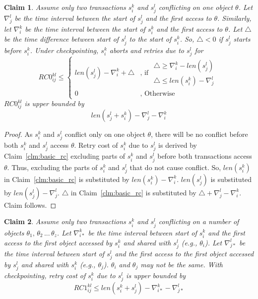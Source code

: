\documentclass[conference]{IEEEtran}
\newtheorem{clm}{Claim}
\begin{document}
\begin{clm}\label{clm:2_tx_cp_retry_cost}
Assume only two transactions $s_i^k$ and $s_j^l$ conflicting on one object $\theta$. Let $\nabla_{j}^{l}$ be the time interval between the start of $s_{j}^{l}$ and the first access to $\theta$. Similarly, let $\nabla_{i}^{k}$ be the time interval between the start of $s_i^k$ and the first access to $\theta$. Let $\triangle$ be the time difference between start of $s_j^l$ to the start of $s_i^k$. So, $\triangle < 0$ if $s_j^l$ starts before $s_i^k$. Under checkpointing, $s_{i}^{k}$ aborts and retries due to $s_{j}^{l}$
for 
\begin{equation}
RC0_{ij}^{kl} \le \begin{cases}
len\left(s_{j}^{l}\right)-\nabla_{i}^{k}+\triangle & \mbox{, if }\begin{gathered}\triangle\ge\nabla_{i}^{k}-len\left(s_{j}^{l}\right)\\
\triangle\le len\left(s_{i}^{k}\right)-\nabla_{j}^{l}
\end{gathered}
\\
0 & \mbox{, Otherwise}
\end{cases}\label{eq:2_tx_cp_retry_cost}
\end{equation}
%
$RC0_{ij}^{kl}$ is upper bounded by 
\begin{equation}
len\left(s_{j}^{l}+s_{i}^{k}\right)-\nabla_{j}^{l}-\nabla_{i}^{k}\label{eq:rc0_upper_bound}
\end{equation}

\end{clm}
%
\begin{proof}
%
As $s_i^k$ and $s_j^l$ conflict only on one object $\theta$, there will be no conflict before both $s_i^k$ and $s_j^l$ access $\theta$. Retry cost of $s_i^k$ due to $s_j^l$ is derived by Claim~\ref{clm:basic_rc} excluding parts of $s_i^k$ and $s_j^l$ before both transactions access $\theta$. Thus, excluding the parts of $s_i^k$ and $s_j^l$ that do not cause conflict. So, $len\left(s_i^k\right)$ in Claim~\ref{clm:basic_rc} is substituted by $len\left(s_i^k\right)-\nabla_i^k$. $len\left(s_j^l\right)$ is substituted by $len\left(s_j^l\right)-\nabla_j^l$. $\triangle$ in Claim~\ref{clm:basic_rc} is substituted by $\triangle+\nabla_j^l-\nabla_i^k$. Claim follows.
%
\end{proof}
%
\begin{clm}\label{clm:rc1_upper_bound}
%
Assume only two transactions $s_i^k$ and $s_j^l$ conflicting on a number of objects $\theta_1,\,\theta_2\,...\,\theta_z$. Let $\nabla_{i*}^k$ be the time interval between start of $s_i^k$ and the first access to the first object accessed by $s_i^k$ and shared with $s_j^l$ (e.g., $\theta_i$). Let $\nabla_{j*}^l$ be the time interval between start of $s_j^l$ and the first access to the first object accessed by $s_j^l$ and shared with $s_i^k$ (e.g., $\theta_j$). $\theta_i$ and $\theta_j$ may not be the same. With checkpointing, retry cost of $s_i^k$ due to $s_j^l$ is upper bounded by 
%
\begin{equation}
RC1_{ij}^{kl} \le len\left(s_i^k+s_j^l\right)-\nabla_{i*}^k-\nabla_{j*}^l
\label{eq:rc1_upper_bound}
\end{equation}
%
\end{clm}
\end{document}

